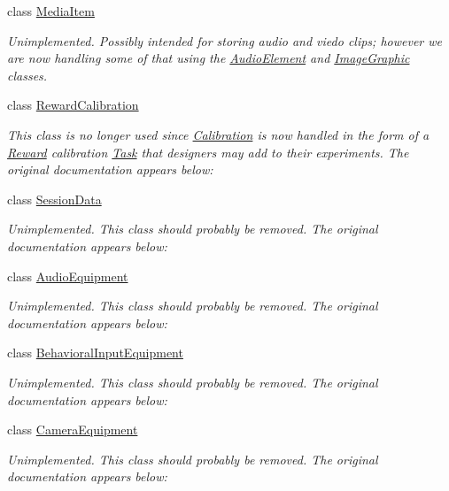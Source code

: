 \begin{DoxyCompactItemize}
class \hyperlink{class_picto_1_1_media_item}{Media\-Item}
\begin{DoxyCompactList}\small\item\em Unimplemented. Possibly intended for storing audio and viedo clips; however we are now handling some of that using the \hyperlink{class_picto_1_1_audio_element}{Audio\-Element} and \hyperlink{class_picto_1_1_image_graphic}{Image\-Graphic} classes. \end{DoxyCompactList}\item 
class \hyperlink{class_picto_1_1_reward_calibration}{Reward\-Calibration}
\begin{DoxyCompactList}\small\item\em This class is no longer used since \hyperlink{class_picto_1_1_calibration}{Calibration} is now handled in the form of a \hyperlink{class_picto_1_1_reward}{Reward} calibration \hyperlink{class_picto_1_1_task}{Task} that designers may add to their experiments. The original documentation appears below\-: \end{DoxyCompactList}\item 
class \hyperlink{class_picto_1_1_session_data}{Session\-Data}
\begin{DoxyCompactList}\small\item\em Unimplemented. This class should probably be removed. The original documentation appears below\-: \end{DoxyCompactList}\item 
class \hyperlink{class_picto_1_1_audio_equipment}{Audio\-Equipment}
\begin{DoxyCompactList}\small\item\em Unimplemented. This class should probably be removed. The original documentation appears below\-: \end{DoxyCompactList}\item 
class \hyperlink{class_picto_1_1_behavioral_input_equipment}{Behavioral\-Input\-Equipment}
\begin{DoxyCompactList}\small\item\em Unimplemented. This class should probably be removed. The original documentation appears below\-: \end{DoxyCompactList}\item 
class \hyperlink{class_picto_1_1_camera_equipment}{Camera\-Equipment}
\begin{DoxyCompactList}\small\item\em Unimplemented. This class should probably be removed. The original documentation appears below\-: \end{DoxyCompactList}\item 

\end{DoxyCompactItemize}
